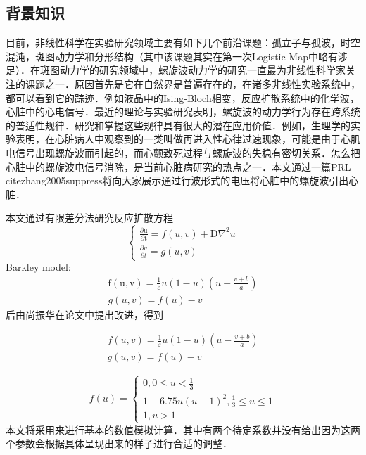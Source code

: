 

\subsection{背景知识}
目前，非线性科学在实验研究领域主要有如下几个前沿课题：孤立子与孤波，时空混沌，斑图动力学和分形结构（其中该课题其实在第一次Logistic Map中略有涉足）．在斑图动力学的研究领域中，螺旋波动力学的研究一直最为非线性科学家关注的课题之一．原因首先是它在自然界是普遍存在的，在诸多非线性实验系统中，都可以看到它的踪迹．例如液晶中的Ising-Bloch相变，反应扩散系统中的化学波，心脏中的心电信号．最近的理论与实验研究表明，螺旋波的动力学行为存在跨系统的普适性规律．研究和掌握这些规律具有很大的潜在应用价值．例如，生理学的实验表明，在心脏病人中观察到的一类叫做再进入性心律过速现象，可能是由于心肌电信号出现螺旋波而引起的，而心颤致死过程与螺旋波的失稳有密切关系．怎么把心脏中的螺旋波电信号消除，是当前心脏病研究的热点之一．本文通过一篇PRL cite{zhang2005suppress}将向大家展示通过行波形式的电压将心脏中的螺旋波引出心脏．

本文通过有限差分法研究反应扩散方程
\begin{equation}
\left\{\begin{array}{c}
\frac{\partial \mathrm{u}}{\partial \mathrm{t}}=f(u, v)+\mathrm{D} \nabla^{2} u \\
\frac{\partial v}{\partial t}=g(u, v)
\end{array}\right.
\end{equation}
Barkley model:
\begin{equation}
\begin{array}{c}
\mathrm{f}(\mathrm{u}, \mathrm{v})=\frac{1}{\varepsilon} u(1-u)\left(u-\frac{v+b}{a}\right) \\
g(u, v)=f(u)-v
\end{array}
\end{equation}
后由尚振华在论文中提出改进，得到

\begin{equation}

\begin{array}{c}
	f(u, v)=\frac{1}{\varepsilon} u(1-u)\left(u-\frac{v+b}{a}\right)\\
	g(u, v)=f(u)-v
\end{array}
\end{equation}

\begin{equation}

f(u)=\left\{\begin{array}{c}
0,0 \leq u<\frac{1}{3} \\
1-6.75 u(u-1)^{2}, \frac{1}{3} \leq u \leq 1 \\
1, u>1
\end{array}\right.
\end{equation}
本文将采用来进行基本的数值模拟计算．其中有两个待定系数并没有给出因为这两个参数会根据具体呈现出来的样子进行合适的调整．
